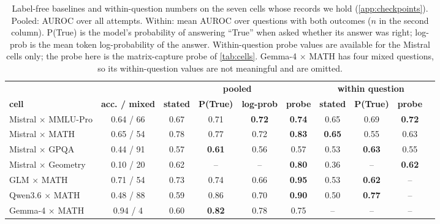 \begin{table}[H]
\caption{Label-free baselines and within-question numbers on the seven cells whose records we hold (\cref{app:checkpoints}). Pooled: AUROC over all attempts. Within: mean AUROC over questions with both outcomes ($n$ in the second column). P(True) is the model's probability of answering ``True'' when asked whether its answer was right; log-prob is the mean token log-probability of the answer. Within-question probe values are available for the Mistral cells only; the probe here is the matrix-capture probe of \cref{tab:cells}. Gemma-4 $\times$ MATH has four mixed questions, so its within-question values are not meaningful and are omitted.}
\label{tab:baselines}
\centering\scriptsize\setlength{\tabcolsep}{3.5pt}
\begin{tabular}{@{}lccccccccc@{}}
\toprule
 & & \multicolumn{4}{c}{\textbf{pooled}} & \multicolumn{3}{c}{\textbf{within question}} \\
\cmidrule(lr){3-6}\cmidrule(lr){7-9}
\textbf{cell} & \textbf{acc. / mixed} & \textbf{stated} & \textbf{P(True)} & \textbf{log-prob} & \textbf{probe} & \textbf{stated} & \textbf{P(True)} & \textbf{probe} \\
\midrule
Mistral $\times$ MMLU-Pro & 0.64 / 66 & 0.67 & 0.71 & \textbf{0.72} & \textbf{0.74} & 0.65 & 0.69 & \textbf{0.72} \\
Mistral $\times$ MATH & 0.65 / 54 & 0.78 & 0.77 & 0.72 & \textbf{0.83} & \textbf{0.65} & 0.55 & 0.63 \\
Mistral $\times$ GPQA & 0.44 / 91 & 0.57 & \textbf{0.61} & 0.56 & 0.57 & 0.53 & \textbf{0.63} & 0.55 \\
Mistral $\times$ Geometry & 0.10 / 20 & 0.62 & -- & -- & \textbf{0.80} & 0.36 & -- & \textbf{0.62} \\
GLM $\times$ MATH & 0.71 / 54 & 0.73 & 0.74 & 0.66 & \textbf{0.95} & 0.53 & \textbf{0.62} & -- \\
Qwen3.6 $\times$ MATH & 0.48 / 88 & 0.59 & 0.86 & 0.70 & \textbf{0.90} & 0.50 & \textbf{0.77} & -- \\
Gemma-4 $\times$ MATH & 0.94 / 4 & 0.60 & \textbf{0.82} & 0.78 & 0.75 & -- & -- & -- \\
\bottomrule
\end{tabular}
\end{table}

